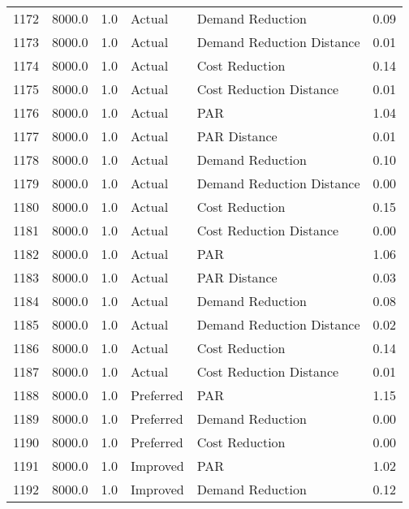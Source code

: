 \begin{longtable}{lrrllr}
1172 &       8000.0 &     1.0 &         Actual &           Demand Reduction &   0.09 \\
1173 &       8000.0 &     1.0 &         Actual &  Demand Reduction Distance &   0.01 \\
1174 &       8000.0 &     1.0 &         Actual &             Cost Reduction &   0.14 \\
1175 &       8000.0 &     1.0 &         Actual &    Cost Reduction Distance &   0.01 \\
1176 &       8000.0 &     1.0 &         Actual &                        PAR &   1.04 \\
1177 &       8000.0 &     1.0 &         Actual &               PAR Distance &   0.01 \\
1178 &       8000.0 &     1.0 &         Actual &           Demand Reduction &   0.10 \\
1179 &       8000.0 &     1.0 &         Actual &  Demand Reduction Distance &   0.00 \\
1180 &       8000.0 &     1.0 &         Actual &             Cost Reduction &   0.15 \\
1181 &       8000.0 &     1.0 &         Actual &    Cost Reduction Distance &   0.00 \\
1182 &       8000.0 &     1.0 &         Actual &                        PAR &   1.06 \\
1183 &       8000.0 &     1.0 &         Actual &               PAR Distance &   0.03 \\
1184 &       8000.0 &     1.0 &         Actual &           Demand Reduction &   0.08 \\
1185 &       8000.0 &     1.0 &         Actual &  Demand Reduction Distance &   0.02 \\
1186 &       8000.0 &     1.0 &         Actual &             Cost Reduction &   0.14 \\
1187 &       8000.0 &     1.0 &         Actual &    Cost Reduction Distance &   0.01 \\
1188 &       8000.0 &     1.0 &      Preferred &                        PAR &   1.15 \\
1189 &       8000.0 &     1.0 &      Preferred &           Demand Reduction &   0.00 \\
1190 &       8000.0 &     1.0 &      Preferred &             Cost Reduction &   0.00 \\
1191 &       8000.0 &     1.0 &       Improved &                        PAR &   1.02 \\
1192 &       8000.0 &     1.0 &       Improved &           Demand Reduction &   0.12 \\

\end{longtable}
